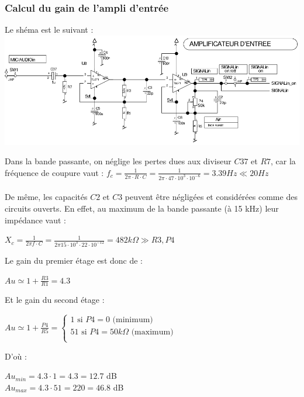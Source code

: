\documentclass{article}
\begin{document}
\subsubsection{Calcul du gain de l'ampli d'entrée}
Le shéma est le suivant :\\
\includegraphics[width = 0.9\linewidth]{shema_echo_entree.png}

Dans la bande passante, on néglige les pertes dues aux diviseur $C37$ et $R7$, car la fréquence de coupure vaut :
$f_c = \frac{1}{2 \pi \cdot R \cdot C} = \frac{1}{2 \pi \cdot 47 \cdot 10^3 \cdot 10^{-6}} = 3.39 Hz \ll 20 Hz$
\\\\
De même, les capacités $C2$ et $C3$ peuvent être négligées et considérées comme des circuits ouverts.
En effet, au maximum de la bande passante (à 15 kHz) leur impédance vaut :
\begin{center}$X_c = \frac{1}{2 \pi f \cdot C} = \frac{1}{2 \pi 15 \cdot 10^3 \cdot 22 \cdot 10^{-12}} = 482 k\Omega \gg R3, P4 $\end{center}
Le gain du premier étage est donc de :
\begin{center}
$Au \simeq 1+\frac{R3}{R1} = 4.3 $
\end{center}
Et le gain du second étage :
\begin{center}
$Au \simeq 1+\frac{P4}{R5} =
\left\{
  \begin{array}{rcr}
    1 \mbox{ si } P4 = 0 \mbox{ (minimum)} \\
    51 \mbox{ si } P4 = 50k\Omega \mbox{ (maximum)} \\
  \end{array}
\right.
$
\end{center}
D'où :
\begin{center}
$Au_{min} = 4.3 \cdot 1 = 4.3  = 12.7$ dB\\
$ Au_{max} = 4.3 \cdot 51 = 220 = 46.8$ dB
\end{center}
\end{document}

